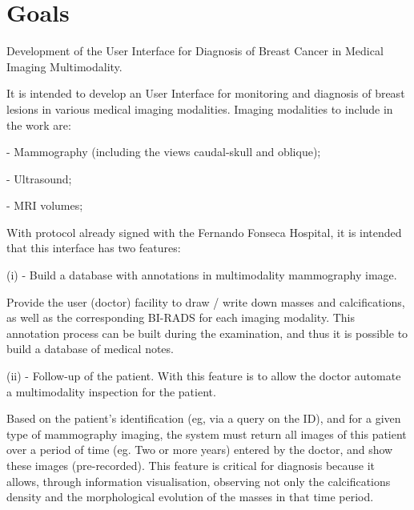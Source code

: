 
\chapter{Goals}
\label{chapter:goals}

Development of the User Interface for Diagnosis of Breast Cancer in Medical Imaging Multimodality.

It is intended to develop an User Interface for monitoring and diagnosis of breast lesions in various medical imaging modalities. Imaging modalities to include in the work are:

- Mammography (including the views caudal-skull and oblique);

- Ultrasound;

- MRI volumes;

With protocol already signed with the Fernando Fonseca Hospital, it is intended that this interface has two features:

(i) - Build a database with annotations in multimodality mammography image.

Provide the user (doctor) facility to draw / write down masses and calcifications, as well as the corresponding BI-RADS for each imaging modality. This annotation process can be built during the examination, and thus it is possible to build a database of medical notes.

(ii) - Follow-up of the patient. With this feature is to allow the doctor automate a multimodality inspection for the patient.

Based on the patient's identification (eg, via a query on the ID), and for a given type of mammography imaging, the system must return all images of this patient over a period of time (eg. Two or more years) entered by the doctor, and show these images (pre-recorded). This feature is critical for diagnosis because it allows, through information visualisation, observing not only the calcifications density and the morphological evolution of the masses in that time period.